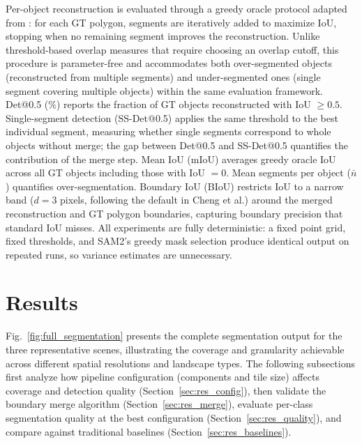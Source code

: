\documentclass[review,11pt,authoryear]{elsarticle}
\begin{document}
Per-object reconstruction is evaluated through a greedy oracle protocol adapted from \citet{clinton2010segmentation_eval}: for each GT polygon, segments are iteratively added to maximize IoU, stopping when no remaining segment improves the reconstruction. Unlike threshold-based overlap measures that require choosing an overlap cutoff, this procedure is parameter-free and accommodates both over-segmented objects (reconstructed from multiple segments) and under-segmented ones (single segment covering multiple objects) within the same evaluation framework. Det@0.5 (\%) reports the fraction of GT objects reconstructed with IoU $\geq 0.5$. Single-segment detection (SS-Det@0.5) applies the same threshold to the best individual segment, measuring whether single segments correspond to whole objects without merge; the gap between Det@0.5 and SS-Det@0.5 quantifies the contribution of the merge step. Mean IoU (mIoU) averages greedy oracle IoU across all GT objects including those with IoU $= 0$. Mean segments per object ($\bar{n}$) quantifies over-segmentation. Boundary IoU (BIoU) \citep{cheng2021boundary} restricts IoU to a narrow band ($d = 3$ pixels, following the default in Cheng et al.) around the merged reconstruction and GT polygon boundaries, capturing boundary precision that standard IoU misses. All experiments are fully deterministic: a fixed point grid, fixed thresholds, and SAM2's greedy mask selection produce identical output on repeated runs, so variance estimates are unnecessary.

\section{Results}
\label{sec:results}

Fig.~\ref{fig:full_segmentation} presents the complete segmentation output for the three representative scenes, illustrating the coverage and granularity achievable across different spatial resolutions and landscape types. The following subsections first analyze how pipeline configuration (components and tile size) affects coverage and detection quality (Section~\ref{sec:res_config}), then validate the boundary merge algorithm (Section~\ref{sec:res_merge}), evaluate per-class segmentation quality at the best configuration (Section~\ref{sec:res_quality}), and compare against traditional baselines (Section~\ref{sec:res_baselines}).
\end{document}

